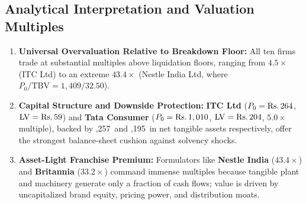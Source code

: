 \subsection{Analytical Interpretation and Valuation Multiples}
\begin{enumerate}[label=\textbf{\arabic*.}, topsep=2pt, itemsep=1.5pt, parsep=0pt]
    \item \textbf{Universal Overvaluation Relative to Breakdown Floor:} All ten firms trade at substantial multiples above liquidation floors, ranging from \textbf{$4.5\times$} (ITC Ltd) to an extreme \textbf{$43.4\times$} (Nestle India Ltd, where $P_0 / \text{TBV} = 1,409 / 32.50$).
    \item \textbf{Capital Structure and Downside Protection:} \textbf{ITC Ltd} ($P_0 = \text{Rs.}\, 264$, $\operatorname{LV} = \text{Rs.}\, 59$) and \textbf{Tata Consumer} ($P_0 = \text{Rs.}\, 1,010$, $\operatorname{LV} = \text{Rs.}\, 204$, \textbf{$5.0\times$} multiple), backed by ,257\crunit\ and ,195\crunit\ in net tangible assets respectively, offer the strongest balance-sheet cushion against solvency shocks.
    \item \textbf{Asset-Light Franchise Premium:} Formulators like \textbf{Nestle India} ($43.4\times$) and \textbf{Britannia} ($33.2\times$) command immense multiples because tangible plant and machinery generate only a fraction of cash flows; value is driven by uncapitalized brand equity, pricing power, and distribution moats.
\end{enumerate}
